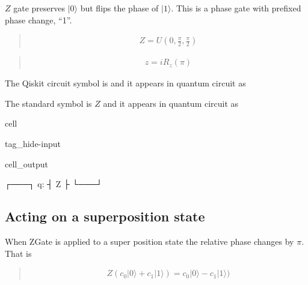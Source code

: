 \documentclass[letterpaper,10pt,english]{jupyterBook}
\begin{document}
\sphinxAtStartPar
\(Z\) gate preserves \(|0\rangle\) but flips the phase of \(|1\rangle\).  This is a phase gate with prefixed phase change, “\sphinxhyphen{}1”.

\sphinxAtStartPar
{}
\begin{quote}
\begin{equation}\label{equation:q1gates/z:ZGate-U}
\begin{split}
Z = U\left(0,\frac{\pi}{2},\frac{\pi}{2}\right)
\end{split}
\end{equation}\end{quote}

\sphinxAtStartPar
{}
\begin{quote}
\begin{equation*}
\begin{split}
z = i R_z(\pi)
\end{split}
\end{equation*}\end{quote}

\sphinxAtStartPar
The Qiskit circuit symbol is  and it appears in quantum circuit as

\sphinxAtStartPar
The standard symbol is \(Z\) and it appears in quantum circuit as

\begin{sphinxuseclass}{cell}
\begin{sphinxuseclass}{tag_hide-input}\begin{sphinxVerbatimOutput}

\begin{sphinxuseclass}{cell_output}
\begin{sphinxVerbatim}[commandchars=\\\{\}]
   ┌───┐
q: ┤ Z ├
   └───┘
\end{sphinxVerbatim}

\end{sphinxuseclass}\end{sphinxVerbatimOutput}

\end{sphinxuseclass}
\end{sphinxuseclass}

\subsection{Acting on a superposition state}
\label{\detokenize{q1gates/z:acting-on-a-superposition-state}}
\sphinxAtStartPar
When ZGate is applied to a super position state the relative phase changes by \(\pi\).  That is
\begin{quote}
\begin{equation}\label{equation:q1gates/z:Z-on-superpos}
\begin{split}
Z \left (c_0 |0\rangle + c_1 |1\rangle\right)  = c_0 |0\rangle - c_1 |1\rangle)
\end{split}
\end{equation}\end{quote}
\end{document}
